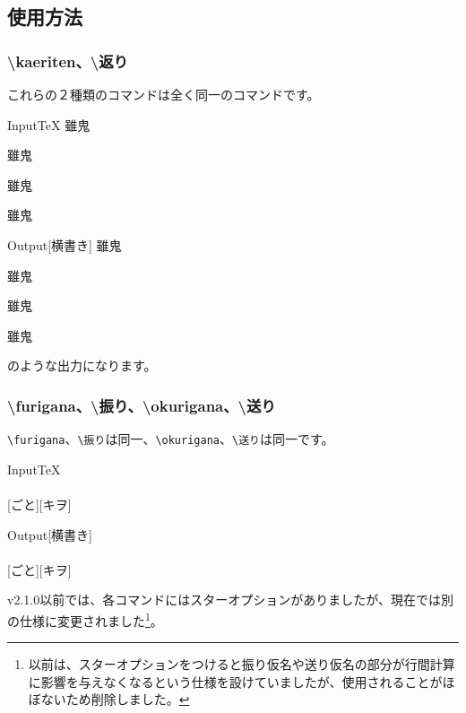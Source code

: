 \documentclass[luatex,fontsize=8pt,paper=b5,twoside]{jlreq}%
\begin{document}
\subsection{使用方法}

\subsubsection{\textbackslash kaeriten、\textbackslash 返り}
これらの２種類のコマンドは全く同一のコマンドです。

\begin{SourceCode}{Input}{TeX}
  雖鬼

  雖鬼

  雖鬼

  雖鬼
\end{SourceCode}

\begin{OutPut}{Output}[横書き]
  雖鬼

  雖鬼

  雖鬼

  雖鬼
\end{OutPut}

のような出力になります。

\subsubsection{\textbackslash furigana、\textbackslash 振り、\textbackslash okurigana、\textbackslash 送り}

\verb|\furigana|、\verb|\振り|は同一、\verb|\okurigana|、\verb|\送り|は同一です。

\begin{SourceCode}{Input}{TeX}
  \\
  \\
  [ごと][キヲ]
\end{SourceCode}

\begin{OutPut}{Output}[横書き]
  \\
  \\
  [ごと][キヲ]
\end{OutPut}

v2.1.0以前では、各コマンドにはスターオプションがありましたが、現在では別の仕様に変更されました\footnote{以前は、スターオプションをつけると振り仮名や送り仮名の部分が行間計算に影響を与えなくなるという仕様を設けていましたが、使用されることがほぼないため削除しました。}。
\end{document}
